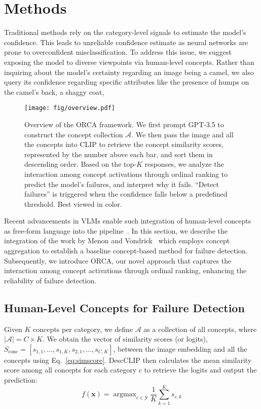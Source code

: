 \section{Methods}
Traditional methods rely on the category-level signals to estimate the model's confidence.
This leads to unreliable confidence estimate as neural networks are prone to overconfident misclassification. 
To address this issue, we suggest exposing the model to diverse viewpoints via human-level concepts. 
Rather than inquiring about the model's certainty regarding an image being a camel, we also query its confidence regarding specific attributes like the presence of humps on the camel's back, a shaggy coat, \etc

\begin{figure*}[!t]
    \centering
    \texttt{[image: fig/overview.pdf]}
    \caption{Overview of the ORCA framework. We first prompt GPT-3.5 to construct the concept collection $\mathcal{A}$. We then pass the image and all the concepts into CLIP to retrieve the concept similarity scores, represented by the number above each bar, and sort them in descending order. Based on the top-$K$ responses, we analyze the interaction among concept activations through ordinal ranking to predict the model's failures, and interpret why it fails. ``Detect failures'' is triggered when the confidence falls below a predefined threshold. Best viewed in color.}
    \label{fig:overview}
\end{figure*}

Recent advancements in VLMs enable such integration of human-level concepts as free-form language into the pipeline~\cite{Menon2022VisualCV, Yang2022LanguageIA, Oikarinen2023LabelFreeCB}. 
In this section, we describe the integration of the work by Menon and Vondrick~\cite{Menon2022VisualCV} which employs concept aggregation to establish a baseline concept-based method for failure detection. Subsequently, we introduce ORCA, our novel approach that captures the interaction among concept activations through ordinal ranking, enhancing the reliability of failure detection.
\subsection{Human-Level Concepts for Failure Detection} \label{sec:desc-clip}
Given $K$ concepts per category, we define $\mathcal{A}$ as a collection of all concepts, where $|\mathcal{A}| = C \times K$. 
We obtain the vector of similarity scores (or logits), $S_{\text{conc}} = [s_{1,1}, \dots, s_{1,K}, s_{2,1}, \dots, s_{C, K}]$, between the image embedding and all the concepts using Eq.~\ref{eq:simscore}.
DescCLIP then calculates the mean similarity score among all concepts for each category $c$ to retrieve the logits and output the prediction:
\begin{equation}
    f(\mathbf{x}) = \operatorname{argmax}_{c\in\mathcal{Y}} \frac{1}{K} \sum_{k=1}^K s_{c, k}
\end{equation}

